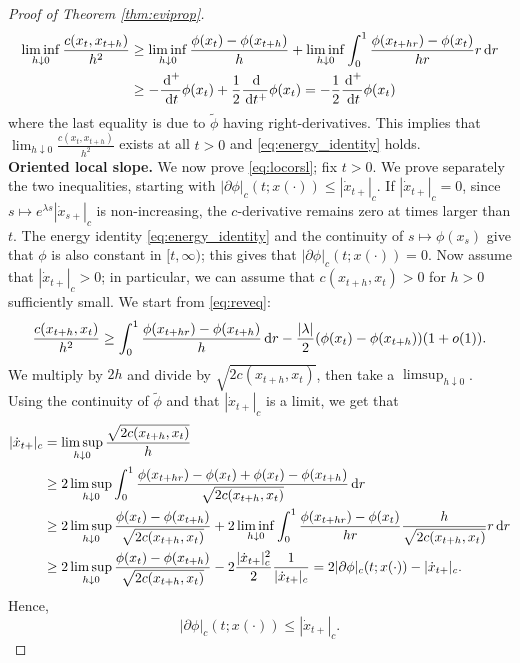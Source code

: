 \documentclass[reqno]{amsart}
\theoremstyle{plain}
\theoremstyle{remark}
\theoremstyle{plain}
\numberwithin{equation}{section}
\theoremstyle{remark}
\newcommand{\tb}{\textbf}
\newcommand{\de}{{\,\rm d}}
\begin{document}
\begin{proof}[Proof of Theorem \ref{thm:eviprop}]
\begin{align}\nonumber
       \liminf_{h \downarrow 0} \frac{ c(x_t,x_{t+h})}{h^2}
       &\ge \liminf_{h \downarrow 0} \frac{\phi(x_t) -\phi(x_{t+h})}{h}+\liminf_{h \downarrow 0}\int_0^1 \frac{\phi(x_{t+hr})-\phi(x_t)}{hr} r\de r\nonumber\\
       &\ge -\frac{\de^+}{\de t}\phi(x_{t})+\frac{1}{2}\frac{\de}{\de t^+}\phi(x_{t})=-\frac{1}{2}\frac{\de^+}{\de t}\phi(x_{t})\label{eq:energy_bound_local_liminf} 
    \end{align}
where the last equality is due to $\tilde{\phi}$ having right-derivatives. This  implies that
$\lim_{h \downarrow 0 } \frac{c(x_t,x_{t+h})}{h^2}$  exists at all $t>0$  and \eqref{eq:energy_identity}  holds. \\ 


    \tb{\bf Oriented local slope.} We now prove \eqref{eq:locorsl}; fix $t>0$. We prove separately the two inequalities, starting with $|\partial \phi|_c(t;x(\cdot)) \le |\dot x_{t+ }|_c$. If $|\dot x_{t+ }|_c=0$, since $s\mapsto e^{\lambda s}|\dot x_{s+ }|_c$ is non-increasing, the $c$-derivative remains zero  at   times larger than $t$. The energy identity \eqref{eq:energy_identity} and the continuity of $s \mapsto \phi(x_s)$ give that $\phi$ is also constant in $[t,\infty)$; this gives that $|\partial \phi|_c(t;x(\cdot))=0$. Now assume that $|\dot x_{t+ }|_c>0$; in particular, we can assume that $c(x_{t+h}, x_t)>0$ for $h>0$ sufficiently small. We start from \eqref{eq:reveq}: 
        \begin{align*}
       \frac{c(x_{t+h},x_t)}{h^2} \ge \int_0^1 \frac{\phi(x_{t+hr}) -\phi(x_{t+h})}{h} \de r -\frac{|\lambda |}{2} (\phi(x_t)-\phi(x_{t+h}))(1+o(1)).
    \end{align*} 
    We multiply by $2h$ and divide by $\sqrt{2c(x_{t+h},x_t)}$, then take a $\limsup_{h \downarrow 0}$. Using the continuity of $\tilde \phi$ and that $|\dot x_{t+ }|_c$ is a limit, we get that
       \begin{align}\nonumber
       |\dot x_{t+ }|_c&=\limsup_{h \downarrow 0} \frac{ \sqrt{2c(x_{t+h},x_t)}}{h} \\
       &\ge 2\limsup_{h \downarrow 0}\int_0^1 \frac{\phi(x_{t+hr})-\phi(x_t)+\phi(x_t) -\phi(x_{t+h})}{\sqrt{2c(x_{t+h},x_t)}} \de r \nonumber \\
       &\ge 2\limsup_{h \downarrow 0} \frac{\phi(x_t) -\phi(x_{t+h})}{\sqrt{2c(x_{t+h},x_t)}}+2\liminf_{h \downarrow 0}\int_0^1 \frac{\phi(x_{t+hr})-\phi(x_t)}{hr} \frac{h}{\sqrt{2c(x_{t+h},x_t)}}r\de r\nonumber\\
       &\ge 2\limsup_{h \downarrow 0} \frac{\phi(x_t) -\phi(x_{t+h})}{\sqrt{2c(x_{t+h},x_t)}} -2\frac{|\dot x_{t+ }|_c^2}{2}\frac{1}{|\dot x_{t+ }|_c}= 2|\partial \phi|_c(t;x(\cdot))-|\dot x_{t+ }|_c.\label{eq:energy_bound_local2_slope} 
    \end{align}
    Hence,
        \begin{equation*}
        |\partial \phi|_c(t;x(\cdot)) \le |\dot x_{t+ }|_c.
    \end{equation*}


\end{proof}
\end{document}
